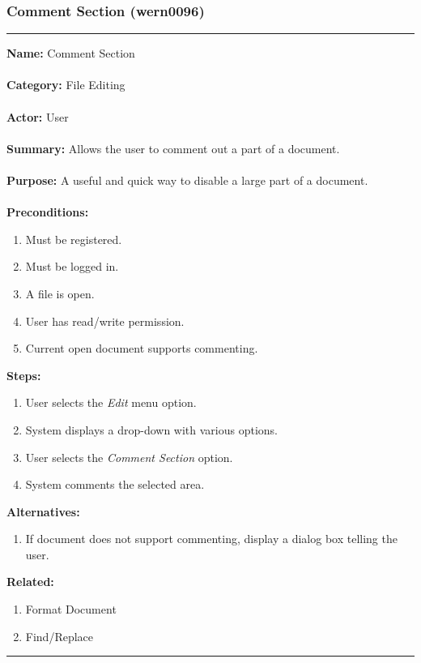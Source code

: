 \documentclass[11pt]{report}
\begin{document}
\newpage

\subsubsection{Comment Section (wern0096)}
\vspace{2pt}
\hrule
\vspace{8pt}
	\noindent\textbf{Name:} Comment Section \\ \\
	\textbf{Category:} File Editing \\ \\
	\textbf{Actor:} User \\ \\
	\textbf{Summary:} Allows the user to comment out a part of a document. \\ \\
	\textbf{Purpose:} A useful and quick way to disable a large part of a document. \\ \\
	\textbf{Preconditions:} 
	\begin{enumerate}
		\item Must be registered.
		\item Must be logged in.
		\item A file is open.
		\item User has read/write permission.
		\item Current open document supports commenting.
	\end{enumerate}
	\textbf{Steps:}
	\begin{enumerate}
		\item User selects the \textit{Edit} menu option.
		\item System displays a drop-down with various options.
		\item User selects the \textit{Comment Section} option.
		\item System comments the selected area.
	\end{enumerate}
	\textbf{Alternatives:}
	\begin{enumerate}
		\item If document does not support commenting, display a dialog box telling the user.
	\end{enumerate}
	\textbf{Related:}
	\begin{enumerate}
		\item Format Document
		\item Find/Replace
	\end{enumerate}
\hrule
\vspace{8pt}
\end{document}
